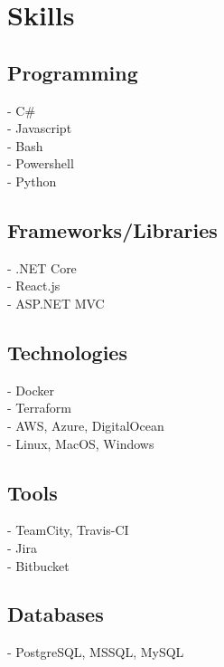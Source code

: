 \documentclass[]{Resume}
\begin{document}
\begin{minipage}[t]{0.33\textwidth}

\section{Skills}
\subsection{Programming}
- C\# \\
- Javascript \\
- Bash \\ 
- Powershell \\
- Python
\sectionsep

\subsection{Frameworks/Libraries}
- .NET Core \\
- React.js \\
- ASP.NET MVC
\sectionsep

\subsection{Technologies}
- Docker \\
- Terraform \\
- AWS, Azure, DigitalOcean \\
- Linux, MacOS, Windows \\
\sectionsep

\subsection{Tools}
- TeamCity, Travis-CI \\
- Jira \\
- Bitbucket
\sectionsep

\subsection{Databases}
- PostgreSQL, MSSQL, MySQL
\sectionsep



%
%

\end{minipage} 
\hfill
\end{document}
